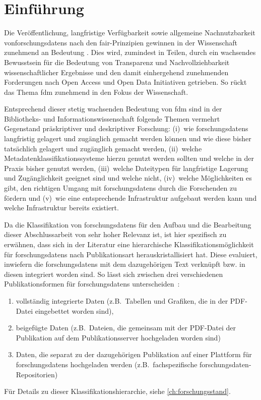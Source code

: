 \chapter{Einführung}\label{ch:einfuehrung}
Die Veröffentlichung, langfristige Verfügbarkeit sowie allgemeine Nachnutzbarkeit von\linebreak \glspl{forschungsdaten} nach den \gls{fair}-Prinzipien \autocite{Wilkinson2016} gewinnen in der Wissenschaft zunehmend an Bedeutung \autocite{TenopirEtAl2017}.
Dies wird, zumindest in Teilen, durch ein wachsendes Bewusstsein für die Bedeutung von Transparenz und Nachvollziehbarkeit wissenschaftlicher Ergebnisse und den damit einhergehend zunehmenden Forderungen nach Open Access und Open Data Initiativen getrieben.
So rückt das Thema \gls{fdm} zunehmend in den Fokus der Wissenschaft.

Entsprechend dieser stetig wachsenden Bedeutung von \gls{fdm} sind in der Bibliotheks- und Informationswissenschaft folgende Themen vermehrt Gegenstand präskriptiver und deskriptiver Forschung:
(i)~wie \glspl{forschungsdaten} langfristig gelagert und zugänglich gemacht werden können und wie diese bisher tatsächlich gelagert und zugänglich gemacht werden,
(ii)~welche Metadatenklassifikationssysteme hierzu genutzt werden sollten und welche in der Praxis bisher genutzt werden,
(iii)~welche Dateitypen für langfristige Lagerung und Zugänglichkeit geeignet sind und welche nicht,
(iv)~welche Möglichkeiten es gibt, den richtigen Umgang mit \glspl{forschungsdaten} durch die Forschenden zu fördern und
(v)~wie eine entsprechende Infrastruktur aufgebaut werden kann und welche Infrastruktur bereits existiert.

Da die Klassifikation von \glspl{forschungsdaten} für den Aufbau und die Bearbeitung dieser Abschlussarbeit von sehr hoher Relevanz ist, ist hier spezifisch zu erwähnen, dass sich in der Literatur eine hierarchische Klassifikationsmöglichkeit für \glspl{forschungsdaten} nach Publikationsart herauskristallisiert hat.
Diese evaluiert, inwiefern die \glspl{forschungsdaten} mit dem dazugehörigen Text verknüpft bzw. in diesen integriert worden sind.
So lässt sich zwischen drei verschiedenen Publikationsformen für \glspl{forschungsdaten} unterscheiden~\autocites[S.~36ff.]{ReillyEtAl2011}:
\begin{enumerate}
    \item vollständig integrierte Daten (z.B.~Tabellen und Grafiken, die in der PDF-Datei eingebettet worden sind),
    \item beigefügte Daten (z.B.~Dateien, die gemeinsam mit der PDF-Datei der Publikation auf dem Publikationsserver hochgeladen worden sind)
    \item Daten, die separat zu der dazugehörigen Publikation auf einer Plattform für \glspl{forschungsdaten} hochgeladen werden (z.B.~fachspezifische \gls{forschungsdaten}-Repositorien)
\end{enumerate}
Für Details zu dieser Klassifikationshierarchie, siehe \cref{ch:forschungsstand}.

